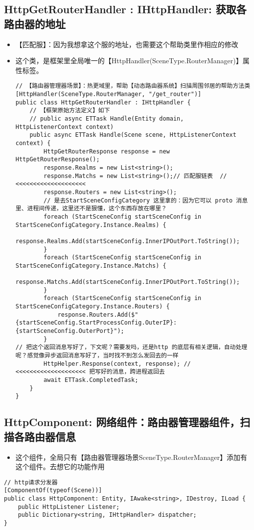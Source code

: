 \documentclass[9pt, b5paper]{article}
\begin{document}
\subsection{HttpGetRouterHandler : IHttpHandler: 获取各路由器的地址}
\label{sec-6-12}
\begin{itemize}
\item 【匹配服】：因为我想拿这个服的地址，也需要这个帮助类里作相应的修改
\item 这个类，是框架里全局唯一的【HttpHandler(SceneType.RouterManager)】属性标签。
\begin{verbatim}
// 【路由器管理器场景】：热更域里，帮助【动态路由器系统】扫描周围邻居的帮助方法类
[HttpHandler(SceneType.RouterManager, "/get_router")]
public class HttpGetRouterHandler : IHttpHandler {
    // 【框架原始方法定义】如下
    // public async ETTask Handle(Entity domain, HttpListenerContext context)
    public async ETTask Handle(Scene scene, HttpListenerContext context) {
        HttpGetRouterResponse response = new HttpGetRouterResponse();
        response.Realms = new List<string>();
        response.Matchs = new List<string>();// 匹配服链表  // <<<<<<<<<<<<<<<<<<<< 
        response.Routers = new List<string>();
        // 是去StartSceneConfigCategory 这里拿的：因为它可以 proto 消息里、进程间传递，这里还不是狠懂，这个东西存放在哪里？
        foreach (StartSceneConfig startSceneConfig in StartSceneConfigCategory.Instance.Realms) {
            response.Realms.Add(startSceneConfig.InnerIPOutPort.ToString());
        }
        foreach (StartSceneConfig startSceneConfig in StartSceneConfigCategory.Instance.Matchs) {
            response.Matchs.Add(startSceneConfig.InnerIPOutPort.ToString());
        }
        foreach (StartSceneConfig startSceneConfig in StartSceneConfigCategory.Instance.Routers) {
            response.Routers.Add($"{startSceneConfig.StartProcessConfig.OuterIP}:{startSceneConfig.OuterPort}");
        }
// 把这个返回消息写好了，下文呢？需要发吗，还是http 的底层有相关逻辑，自动处理呢？感觉像异步返回消息写好了，当时找不到怎么发回去的一样
        HttpHelper.Response(context, response); // <<<<<<<<<<<<<<<<<<<< 把写好的消息，跨进程返回去
        await ETTask.CompletedTask;
    }
}
\end{verbatim}
\end{itemize}
\subsection{HttpComponent: 网络组件：路由器管理器组件，扫描各路由器信息}
\label{sec-6-13}
\begin{itemize}
\item 这个组件，全局只有【路由器管理器场景SceneType.RouterManager】添加有这个组件。去想它的功能作用
\end{itemize}
\begin{verbatim}
// http请求分发器
[ComponentOf(typeof(Scene))]
public class HttpComponent: Entity, IAwake<string>, IDestroy, ILoad {
    public HttpListener Listener;
    public Dictionary<string, IHttpHandler> dispatcher;
}
\end{verbatim}
\end{document}
